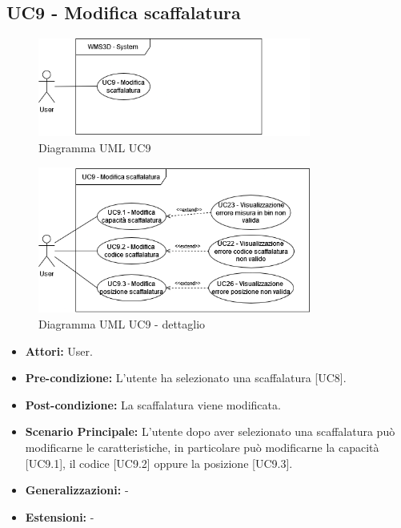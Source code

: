 \subsection{UC9 - Modifica scaffalatura}
\begin{figure}[H]
  \centering
  \includegraphics[width=0.8\textwidth]{UC_diagrams_1-10/UC9_sys.drawio.png}
   \caption{Diagramma UML UC9}
\end{figure}
\begin{figure}[H]
  \centering
  \includegraphics[width=0.8\textwidth]{UC_diagrams_1-10/UC9.drawio.png}
   \caption{Diagramma UML UC9 - dettaglio}
\end{figure}
\begin{itemize}
    \item \textbf{Attori:} User.
    \item \textbf{Pre-condizione:}  L'utente ha selezionato una scaffalatura [UC8].
    \item \textbf{Post-condizione:} La scaffalatura viene modificata.
    \item \textbf{Scenario Principale:} L'utente dopo aver selezionato una scaffalatura può modificarne le caratteristiche, in particolare può modificarne la capacità [UC9.1], il codice [UC9.2] oppure la posizione [UC9.3].
    \item \textbf{Generalizzazioni:} -
    \item \textbf{Estensioni:} -
\end{itemize}


